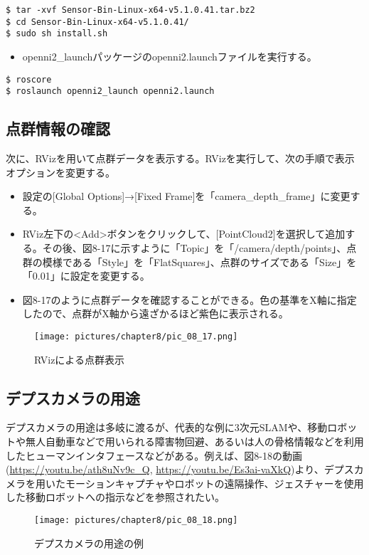 \begin{lstlisting}[language=ROS]
$ tar -xvf Sensor-Bin-Linux-x64-v5.1.0.41.tar.bz2
$ cd Sensor-Bin-Linux-x64-v5.1.0.41/
$ sudo sh install.sh
\end{lstlisting}

\begin{itemize}
\item openni2\_launchパッケージのopenni2.launchファイルを実行する。
\end{itemize}

\begin{lstlisting}[language=ROS]
$ roscore
$ roslaunch openni2_launch openni2.launch
\end{lstlisting}

\subsection{点群情報の確認}

次に、RVizを用いて点群データを表示する。RVizを実行して、次の手順で表示オプションを変更する。

\begin{itemize}
\item 設定の[Global Options]→[Fixed Frame]を「camera\_depth\_frame」に変更する。
\item RViz左下の<Add>ボタンをクリックして、[PointCloud2]を選択して追加する。その後、図8-17に示すように「Topic」を「/camera/depth/points」、点群の模様である「Style」を「FlatSquares」、点群のサイズである「Size」を「0.01」に設定を変更する。
\item 図8-17のように点群データを確認することができる。色の基準をX軸に指定したので、点群がX軸から遠ざかるほど紫色に表示される。
\end{itemize}

\begin{figure}[htp]
  \centering
  \texttt{[image: pictures/chapter8/pic\_08\_17.png]}
  \caption{RVizによる点群表示}
\end{figure}

\subsection{デプスカメラの用途}

デプスカメラの用途は多岐に渡るが、代表的な例に3次元SLAMや、移動ロボットや無人自動車などで用いられる障害物回避、あるいは人の骨格情報などを利用したヒューマンインタフェースなどがある。例えば、図8-18の動画(\url{https://youtu.be/ath8uNv9c\_Q}, \url{https://youtu.be/Es3ai-vaXkQ})より、デプスカメラを用いたモーションキャプチャやロボットの遠隔操作、ジェスチャーを使用した移動ロボットへの指示などを参照されたい。

\begin{figure}[htp]
  \centering
  \texttt{[image: pictures/chapter8/pic\_08\_18.png]}
  \caption{デプスカメラの用途の例}
\end{figure}

